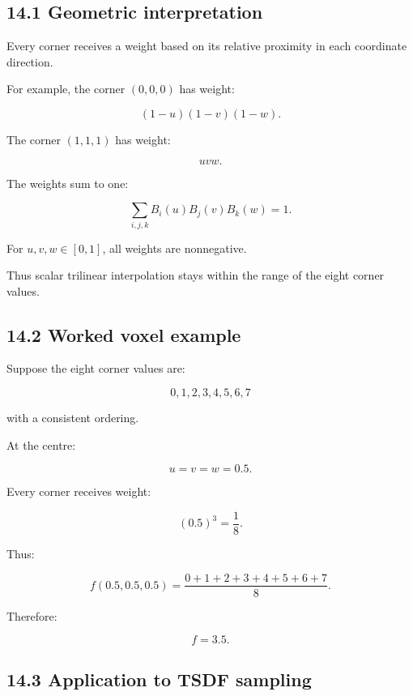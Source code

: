 \subsection{14.1 Geometric interpretation}\label{02-foundations-ii-ch028-geometric-interpretation}

\hypertarget{02-foundations-ii-ch028-geometric-interpretation}{}

Every corner receives a weight based on its relative proximity in each coordinate direction.

For example, the corner \((0,0,0)\) has weight:

\[ (1-u)(1-v)(1-w). \]

The corner \((1,1,1)\) has weight:

\[ uvw. \]

The weights sum to one:

\[ \sum_{i,j,k}B_i(u)B_j(v)B_k(w)=1. \]

For \(u,v,w\in[0,1]\), all weights are nonnegative.

Thus scalar trilinear interpolation stays within the range of the eight corner values.

\subsection{14.2 Worked voxel example}\label{02-foundations-ii-ch028-worked-voxel-example}

\hypertarget{02-foundations-ii-ch028-worked-voxel-example}{}

Suppose the eight corner values are:

\[ 0,1,2,3,4,5,6,7 \]

with a consistent ordering.

At the centre:

\[ u=v=w=0.5. \]

Every corner receives weight:

\[ (0.5)^3=\frac18. \]

Thus:

\[ f(0.5,0.5,0.5) = \frac{0+1+2+3+4+5+6+7}{8}. \]

Therefore:

\[ \boxed{f=3.5}. \]

\subsection{14.3 Application to TSDF sampling}\label{02-foundations-ii-ch028-application-to-tsdf-sampling}

